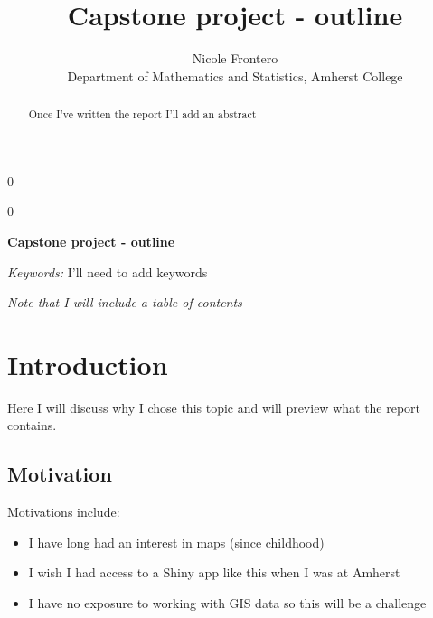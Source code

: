 \documentclass[12pt]{article}
\providecommand{\tightlist}{%
  \setlength{\itemsep}{0pt}\setlength{\parskip}{0pt}}
\newcommand{\blind}{0}
\begin{document}
\def\spacingset#1{\renewcommand{\baselinestretch}%
{#1}\small\normalsize} \spacingset{1}



\blind
{
  \title{\bf Capstone project - outline}

  \author{
        Nicole Frontero \\
    Department of Mathematics and Statistics, Amherst College\\
      }
  \maketitle
} \fi

\blind
{
  \bigskip
  \bigskip
  \bigskip
  \begin{center}
    {\LARGE\bf Capstone project - outline}
  \end{center}
  \medskip
} \fi

\bigskip
\begin{abstract}
Once I've written the report I'll add an abstract
\end{abstract}

\noindent%
{\it Keywords:} I'll need to add keywords
\vfill

\newpage
\spacingset{1.45} %

\emph{Note that I will include a table of contents}

\hypertarget{introduction}{%
\section{Introduction}\label{introduction}}

Here I will discuss why I chose this topic and will preview what the
report contains.

\hypertarget{motivation}{%
\subsection{Motivation}\label{motivation}}

Motivations include:

\begin{itemize}
\tightlist
\item
  I have long had an interest in maps (since childhood)
\item
  I wish I had access to a Shiny app like this when I was at Amherst
\item
  I have no exposure to working with GIS data so this will be a
  challenge
\end{itemize}
\end{document}
